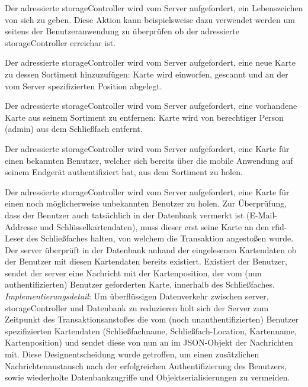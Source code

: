 \begin{description}\setlength\itemsep{1.5em}
\item[\mono{storage-unit-ping}] Der adressierte \gls{storageController} wird vom Server aufgefordert, ein Lebenszeichen von sich zu geben. Diese Aktion kann beispielsweise dazu verwendet werden um seitens der Benutzeranwendung zu überprüfen ob der adressierte \gls{storageController} erreichar ist.      
\item[\mono{storage-unit-new-card}] Der adressierte \gls{storageController} wird vom Server aufgefordert, eine neue Karte zu dessen Sortiment hinzuzufügen: Karte wird einworfen, gescannt und an der vom Server spezifizierten Position abgelegt. 
\item[\mono{storage-unit-delete-card}] Der adressierte \gls{storageController} wird vom Server aufgefordert, eine vorhandene Karte aus seinem Sortiment zu entfernen: Karte wird von berechtiger Person (\gls{admin}) aus dem Schließfach entfernt.
\item[\mono{storage-unit-fetch-card-source-mobile}] Der adressierte \gls{storageController} wird vom Server aufgefordert, eine Karte für einen bekannten Benutzer, welcher sich bereits über die mobile Anwendung auf seinem Endgerät authentifiziert hat, aus dem Sortiment zu holen.  
\item[\mono{storage-unit-fetch-card-source-terminal}] Der adressierte \gls{storageController} wird vom Server aufgefordert, eine Karte für einen noch möglicherweise unbekannten Benutzer zu holen. Zur Überprüfung, dass der Benutzer auch tatsächlich in der Datenbank vermerkt ist (E-Mail-Addresse und Schlüsselkartendaten), muss dieser erst seine Karte an den \acrshort{rfid}-Leser des Schließfaches halten, von welchem die Transaktion angestoßen wurde. Der \gls{server} überprüft in der Datenbank anhand der eingelesenen Kartendaten ob der Benutzer mit diesen Kartendaten bereits existiert. Existiert der Benutzer, sendet der \gls{server} eine Nachricht mit der Kartenposition, der vom (nun authentifizierten) Benutzer geforderten Karte, innerhalb des Schließfaches. \textit{Implementierungsdetail}: Um überflüssigen Datenverkehr zwischen \gls{server}, \gls{storageController} und Datenbank zu reduzieren holt sich der Server zum Zeitpunkt des Transaktionsanstoßes die vom (noch unauthentifizierten) Benutzer spezifizierten Kartendaten (Schließfachname, Schließfach-Location, Kartenname, Kartenposition) und sendet diese von nun an im JSON-Objekt der Nachrichten mit. Diese Designentscheidung wurde getroffen, um einen zusätzlichen Nachrichtenaustausch nach der erfolgreichen Authentifizierung des Benutzers, sowie wiederholte Datenbankzugriffe und Objektserialisierungen zu vermeiden.   

\end{description}
